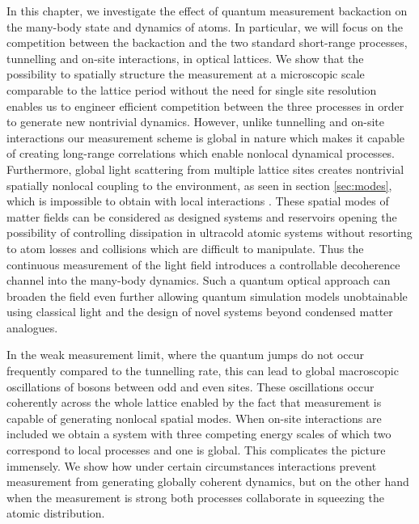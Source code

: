 In this chapter, we investigate the effect of quantum measurement
backaction on the many-body state and dynamics of atoms. In
particular, we will focus on the competition between the backaction
and the two standard short-range processes, tunnelling and on-site
interactions, in optical lattices. We show that the possibility to
spatially structure the measurement at a microscopic scale comparable
to the lattice period without the need for single site resolution
enables us to engineer efficient competition between the three
processes in order to generate new nontrivial dynamics. However,
unlike tunnelling and on-site interactions our measurement scheme is
global in nature which makes it capable of creating long-range
correlations which enable nonlocal dynamical processes. Furthermore,
global light scattering from multiple lattice sites creates nontrivial
spatially nonlocal coupling to the environment, as seen in section
\ref{sec:modes}, which is impossible to obtain with local interactions
\cite{diehl2008, syassen2008, daley2014}. These spatial modes of
matter fields can be considered as designed systems and reservoirs
opening the possibility of controlling dissipation in ultracold
atomic systems without resorting to atom losses and collisions which
are difficult to manipulate. Thus the continuous measurement of the
light field introduces a controllable decoherence channel into the
many-body dynamics. Such a quantum optical approach can broaden the
field even further allowing quantum simulation models unobtainable
using classical light and the design of novel systems beyond condensed
matter analogues.

In the weak measurement limit, where the quantum jumps do not occur
frequently compared to the tunnelling rate, this can lead to global
macroscopic oscillations of bosons between odd and even sites. These
oscillations occur coherently across the whole lattice enabled by the
fact that measurement is capable of generating nonlocal spatial
modes. When on-site interactions are included we obtain a system with
three competing energy scales of which two correspond to local
processes and one is global. This complicates the picture
immensely. We show how under certain circumstances interactions
prevent measurement from generating globally coherent dynamics, but on
the other hand when the measurement is strong both processes
collaborate in squeezing the atomic distribution.

